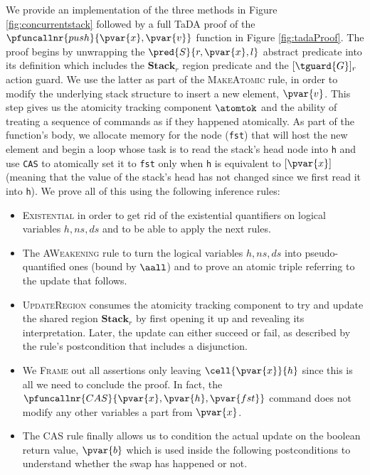 We provide an implementation of the three methods in Figure \ref{fig:concurrentstack} followed by a full TaDA proof of the $\pfuncallnr{push}{\pvar{x}, \pvar{v}}$ function in Figure \ref{fig:tadaProof}. The proof begins by unwrapping the $\pred{S}{r, \pvar{x}, l}$ abstract predicate into its definition which includes the $\textbf{Stack}_r$ region predicate and the $[\tguard{G}]_r$  action guard. We use the latter as part of the \textsc{MakeAtomic} rule, in order to modify the underlying stack structure to insert a new element, $\pvar{v}$. This step gives us the atomicity tracking component $\atomtok$ and the ability of treating a sequence of commands as if they happened atomically. As part of the function's body, we allocate memory for the node (\texttt{fst}) that will host the new element and begin a loop whose task is to read the stack's head node into \texttt{h} and use \texttt{CAS} to atomically set it to \texttt{fst} only when \texttt{h} is equivalent to $[\pvar{x}]$ (meaning that the value of the stack's head has not changed since we first read it into \texttt{h}). We prove all of this using the following inference rules:
\begin{itemize}
\item \textsc{Existential} in order to get rid of the existential quantifiers on logical variables $h, ns, ds$ and to be able to apply the next rules.
\item The \textsc{AWeakening} rule to turn the logical variables $h, ns, ds$ into pseudo-quantified ones (bound by $\aall$) and to prove an atomic triple referring to the update that follows.
\item \textsc{UpdateRegion} consumes the atomicity tracking component to try and update the shared region $\textbf{Stack}_r$ by first opening it up and revealing its interpretation. Later, the update can either succeed or fail, as described by the rule's postcondition that includes a disjunction.
\item We \textsc{Frame} out all assertions only leaving $\cell{\pvar{x}}{h}$ since this is all we need to conclude the proof. In fact, the $\pfuncallnr{CAS}{\pvar{x}, \pvar{h}, \pvar{fst}}$ command does not modify any other variables a part from $\pvar{x}$.
\item The \textsc{CAS} rule finally allows us to condition the actual update on the boolean return value, $\pvar{b}$ which is used inside the following postconditions to understand whether the swap has happened or not.
\end{itemize}

